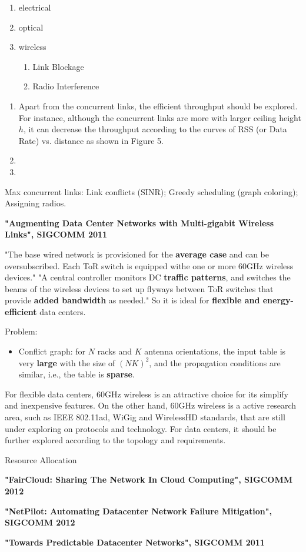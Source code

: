 \documentclass[journal,onecolumn,11pt]{IEEEtran}
\begin{document}
\begin{enumerate}
  \item electrical
  \item optical
  \item wireless
  \begin{enumerate}
    \item Link Blockage
    \item Radio Interference
  \end{enumerate}
\end{enumerate}

\begin{enumerate}
  \item Apart from the concurrent links, the efficient throughput should be explored. For instance, although the concurrent links are more with larger ceiling height $h$, it can decrease the throughput according to the curves of RSS (or Data Rate) vs. distance as shown in Figure 5.
  \item
  \item
\end{enumerate}

Max concurrent links: Link conflicts (SINR); Greedy scheduling (graph coloring); Assigning radios.


\textbf{"Augmenting Data Center Networks with Multi-gigabit Wireless Links", SIGCOMM 2011}

"The base wired network is provisioned for the \textbf{average case} and can be oversubscribed. Each ToR switch is equipped withe one or more 60GHz wireless devices." "A central controller monitors DC \textbf{traffic patterns}, and switches the beams of the wireless devices to set up flyways between ToR switches that provide \textbf{added bandwidth} as needed." So it is ideal for \textbf{flexible and energy-efficient} data centers.

Problem:
\begin{itemize}
  \item Conflict graph: for $N$ racks and $K$ antenna orientations, the input table is very \textbf{large} with the size of $(NK)^2$, and the propagation conditions are similar, i.e., the table is \textbf{sparse}.
\end{itemize}

For flexible data centers, 60GHz wireless is an attractive choice for its simplify and inexpensive features. On the other hand, 60GHz wireless is a active research area, such as IEEE 802.11ad, WiGig and WirelessHD standards, that are still under exploring on protocols and technology. For data centers, it should be further explored according to the topology and requirements.

Resource Allocation

\textbf{"FairCloud: Sharing The Network In Cloud Computing", SIGCOMM 2012}

\textbf{"NetPilot: Automating Datacenter Network Failure Mitigation", SIGCOMM 2012}

\textbf{"Towards Predictable Datacenter Networks", SIGCOMM 2011}
\end{document}
